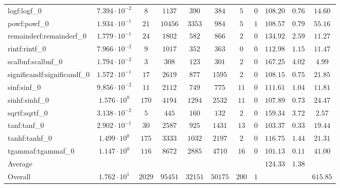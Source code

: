 \begin{tabular}{|l|c|c|c|c|c|c|c|c|c|c|}
logf:logf\_0                 & $ 7.394 \cdot 10^{-2} $ & $ 8      $ & $ 1137  $ & $ 390   $ & $ 384   $ & $ 5   $ & $ 0 $ & $ 108.20      $ & $ 0.76    $ & $ 14.60   $ \\
powf:powf\_0                 & $ 1.934 \cdot 10^{-1} $ & $ 21     $ & $ 10456 $ & $ 3353  $ & $ 984   $ & $ 5   $ & $ 1 $ & $ 108.57      $ & $ 0.79    $ & $ 55.16   $ \\
remainderf:remainderf\_0     & $ 1.779 \cdot 10^{-1} $ & $ 24     $ & $ 1802  $ & $ 582   $ & $ 866   $ & $ 2   $ & $ 0 $ & $ 134.92      $ & $ 2.59    $ & $ 11.27   $ \\
rintf:rintf\_0               & $ 7.966 \cdot 10^{-2} $ & $ 9      $ & $ 1017  $ & $ 352   $ & $ 363   $ & $ 0   $ & $ 0 $ & $ 112.98      $ & $ 1.15    $ & $ 11.47   $ \\
scalbnf:scalbnf\_0           & $ 1.794 \cdot 10^{-2} $ & $ 3      $ & $ 308   $ & $ 123   $ & $ 301   $ & $ 2   $ & $ 0 $ & $ 167.25      $ & $ 4.02    $ & $ 4.99    $ \\
significandf:significandf\_0 & $ 1.572 \cdot 10^{-1} $ & $ 17     $ & $ 2619  $ & $ 877   $ & $ 1595  $ & $ 2   $ & $ 0 $ & $ 108.15      $ & $ 0.75    $ & $ 21.85   $ \\
sinf:sinf\_0                 & $ 9.856 \cdot 10^{-2} $ & $ 11     $ & $ 2112  $ & $ 749   $ & $ 775   $ & $ 11  $ & $ 0 $ & $ 111.61      $ & $ 1.04    $ & $ 11.81   $ \\
sinhf:sinhf\_0               & $ 1.576 \cdot 10^{0}  $ & $ 170    $ & $ 4194  $ & $ 1294  $ & $ 2532  $ & $ 11  $ & $ 0 $ & $ 107.89      $ & $ 0.73    $ & $ 24.47   $ \\
sqrtf:sqrtf\_0               & $ 3.138 \cdot 10^{-2} $ & $ 5      $ & $ 445   $ & $ 160   $ & $ 132   $ & $ 2   $ & $ 0 $ & $ 159.34      $ & $ 3.72    $ & $ 2.57    $ \\
tanf:tanf\_0                 & $ 2.902 \cdot 10^{-1} $ & $ 30     $ & $ 2587  $ & $ 925   $ & $ 1431  $ & $ 13  $ & $ 0 $ & $ 103.37      $ & $ 0.33    $ & $ 19.44   $ \\
tanhf:tanhf\_0               & $ 1.499 \cdot 10^{0}  $ & $ 175    $ & $ 3333  $ & $ 1032  $ & $ 2197  $ & $ 2   $ & $ 0 $ & $ 116.75      $ & $ 1.44    $ & $ 21.31   $ \\
tgammaf:tgammaf\_0           & $ 1.147 \cdot 10^{0}  $ & $ 116    $ & $ 8672  $ & $ 2885  $ & $ 4710  $ & $ 16  $ & $ 0 $ & $ 101.13      $ & $ 0.11    $ & $ 41.00   $ \\
\hline
Average                      & $                     $ & $        $ & $       $ & $       $ & $       $ & $     $ & $   $ & $ 124.33      $ & $ 1.38    $ & $         $ \\
\hline
Overall                      & $ 1.762 \cdot 10^{1}  $ & $ 2029   $ & $ 95451 $ & $ 32151 $ & $ 50175 $ & $ 200 $ & $ 1 $ & $             $ & $         $ & $ 615.85  $ \\
\hline
\end{tabular}
